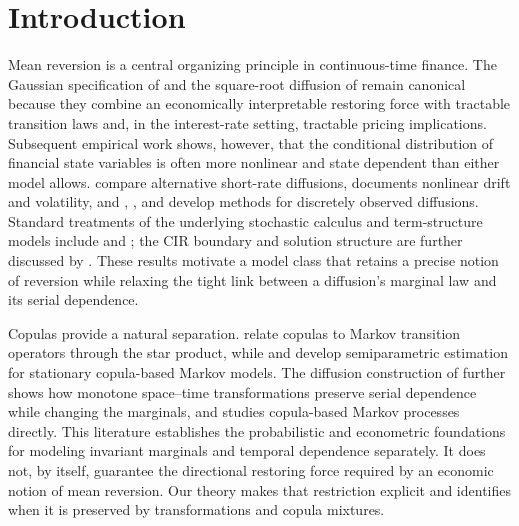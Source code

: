\section{Introduction}
\label{sec:introduction}

Mean reversion is a central organizing principle in continuous-time finance.
The Gaussian specification of \citet{Vasicek1977} and the square-root diffusion
of \citet{CoxIngersollRoss1985} remain canonical because they combine an
economically interpretable restoring force with tractable transition laws and,
in the interest-rate setting, tractable pricing implications.  Subsequent
empirical work shows, however, that the conditional distribution of financial
state variables is often more nonlinear and state dependent than either model
allows.  \citet{ChanEtAl1992} compare alternative short-rate diffusions,
\citet{AitSahalia1996} documents nonlinear drift and volatility, and
\citet{BibbySorensen1995}, \citet{AitSahalia2002}, and \citet{Kessler1997}
develop methods for discretely observed diffusions.  Standard treatments of
the underlying stochastic calculus and term-structure models include
\citet{Shreve2004} and \citet{BrigoMercurio2006}; the CIR boundary and solution
structure are further discussed by \citet{PlatenHeath2006}.  These results motivate a model class that
retains a precise notion of reversion while relaxing the tight link between a
diffusion's marginal law and its serial dependence.

Copulas provide a natural separation.  \citet{DarsowNguyenOlsen1992} relate
copulas to Markov transition operators through the star product, while
\citet{ChenFan2006} and \citet{ChenWuYi2009} develop semiparametric estimation
for stationary copula-based Markov models.  The diffusion construction of
\citet{BibbonaSacerdoteTorre2016} further shows how monotone space--time
transformations preserve serial dependence while changing the marginals, and
\citet{FangJiangLiuYang2020} studies copula-based Markov processes directly.
This literature establishes the probabilistic and econometric foundations for
modeling invariant marginals and temporal dependence separately.  It does not,
by itself, guarantee the directional restoring force required by an economic
notion of mean reversion.  Our theory makes that restriction explicit and
identifies when it is preserved by transformations and copula mixtures.

